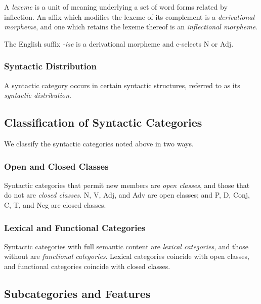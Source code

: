 A \emph{lexeme} is a unit of meaning underlying a set of word forms related by inflection. An affix which modifies the
lexeme of its complement is a \emph{derivational morpheme}, and one which retains the lexeme thereof is an
\emph{inflectional morpheme}.

\Bxm
  The English suffix \textit{-ise} is a derivational morpheme and c-selects N or Adj.
\Exm

\subsubsection{Syntactic Distribution}

A syntactic category occurs in certain syntactic structures, referred to as its \emph{syntactic distribution}.

\subsection{Classification of Syntactic Categories}

We classify the syntactic categories noted above in two ways.

\subsubsection{Open and Closed Classes}

Syntactic categories that permit new members are \emph{open classes}, and those that do not are \emph{closed classes}.
N, V, Adj, and Adv are open classes; and P, D, Conj, C, T, and Neg are closed classes.

\subsubsection{Lexical and Functional Categories}

Syntactic categories with full semantic content are \emph{lexical categories}, and those without are \emph{functional
categories}. Lexical categories coincide with open classes, and functional categories coincide with closed classes.

\subsection{Subcategories and Features}

